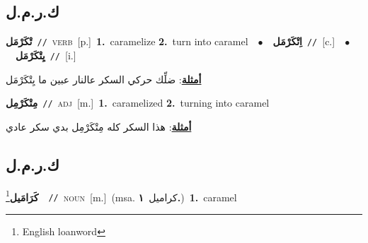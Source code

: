 \documentclass[10pt,a4paper,twoside]{article} %
\begin{document}
\begin{multicols}{2}
\vspace{-3mm}
\subsection*{\color{blue}\foreignlanguage{arabic}{ك.ر.م.ل}\color{blue}{}} 

{\setlength\topsep{0pt}\textbf{\foreignlanguage{arabic}{تْكَرْمَل}}\ {\color{gray}\texttt{//}\color{black}}\ \textsc{verb}\ [p.]\ \textbf{1.}~caramelize  \textbf{2.}~turn into caramel\ \ $\bullet$\ \ \setlength\topsep{0pt}\textbf{\foreignlanguage{arabic}{اِتْكَرْمَل}}\ {\color{gray}\texttt{//}\color{black}}\ [c.]\ \ $\bullet$\ \ \setlength\topsep{0pt}\textbf{\foreignlanguage{arabic}{يِتْكَرْمَل}}\ {\color{gray}\texttt{//}\color{black}}\ [i.]\  \begin{flushright}\color{gray}\foreignlanguage{arabic}{\textbf{\underline{\foreignlanguage{arabic}{أمثلة}}}: ضلِّك حركي السكر عالنار عبين ما يِتْكَرْمَل}\end{flushright}\color{black}} \vspace{2mm}

{\setlength\topsep{0pt}\textbf{\foreignlanguage{arabic}{مِتْكَرْمِل}}\ {\color{gray}\texttt{//}\color{black}}\ \textsc{adj}\ [m.]\ \textbf{1.}~caramelized  \textbf{2.}~turning into caramel\  \begin{flushright}\color{gray}\foreignlanguage{arabic}{\textbf{\underline{\foreignlanguage{arabic}{أمثلة}}}: هذا السكر كله مِتْكَرْمِل بدي سكر عادي}\end{flushright}\color{black}} \vspace{2mm}

\vspace{-3mm}
\subsection*{\color{blue}\foreignlanguage{arabic}{ك.ر.م.ل}\color{blue}{ (ntws)}} 

{\setlength\topsep{0pt}\textbf{\foreignlanguage{arabic}{كَرَامَيل}}\footnote{English loanword}\ \ {\color{gray}\texttt{//}\color{black}}\ \textsc{noun}\ [m.]\ \color{gray}(msa. \foreignlanguage{arabic}{كراميل}~\foreignlanguage{arabic}{\textbf{١.}})\color{black}\ \textbf{1.}~caramel\ } \vspace{2mm}


\end{multicols}
\end{document}
